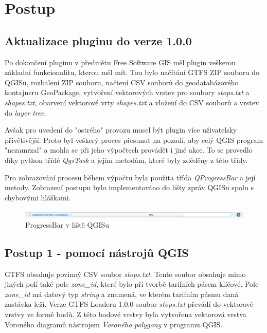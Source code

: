 \chapter{Postup}
\label{5-postup}

\section{Aktualizace pluginu do verze 1.0.0}
Po dokončení pluginu v předmětu Free Software GIS měl plugin veškerou základní 
funkcionalitu, kterou měl mít. Tou bylo načítání GTFS ZIP souboru do QGISu,
rozbalení ZIP souboru, načtení CSV souborů do geodatabázového kontajneru GeoPackage,
vytvoření vektorových vrstev pro soubory \textit{stops.txt} a \textit{shapes.txt},
obarvení vektorové vrty \textit{shapes.txt} a vložení do CSV souborů a vrstev do
\textit{layer tree}.

Avšak pro uvedení do "ostrého" provozu musel být plugin více uživatelsky přívětivější.
Proto byl veškerý proces přesunut na pozadí, aby celý QGIS program "nezamrzal" a
mohla se při jeho výpočtech provádět i jiné akce. To se provedlo díky python třídě \textit{QgsTask}
a jejím metodám, které byly zděděny z této třídy. \cite{QgsTask}

Pro zobrazování procesu během výpočtu byla použita třída \textit{QProgressBar} a její metody.
Zobrazení postupu bylo implementováno do lišty zpráv QGISu spolu s chybovými hláškami.

\begin{figure}[H] \centering
    \includegraphics[width=400pt]{./pictures/loading.png}
    \caption[ProgressBar]{ProgressBar v liště QGISu}
	\label{fig:ProgressBar v liště QGISu}              
\end{figure}     


\section{Postup 1 - pomocí nástrojů QGIS}

GTFS obsahuje povinný CSV soubor \textit{stops.txt}. Tento soubor obsahuje mimo
jiných polí také pole \textit{zone\_id}, které bylo při tvorbě tarifních pásem klíčové. 
Pole \textit{zone\_id} má datový typ \textit{string} a znamená, ve kterém tarifním
pásmu daná zastávka leží. Verze GTFS Loaderu 1.0.0 soubor \textit{stops.txt} převádí do vektorové vrstvy
ve formě bodů. Z této bodové vrstvy byla vytvořena vektorová vrstva Voroného 
diagramů nástrojem \textit{Voroného polygony} v programu QGIS. 

